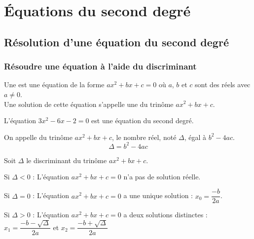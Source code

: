 \chapter[Equ. 2nd degré]{Équations du second degré}
\thispagestyle{fancy}

\section{Résolution d'une équation du second degré}

\subsection{Résoudre une équation à l'aide du discriminant}

    \begin{definition}
        Une  est une équation de la forme $ax^2+bx+c=0$ où $a$, $b$ et $c$ sont des réels avec $a\neq 0$.\\
        Une solution de cette équation s'appelle une  du trinôme $ax^2+bx+c$.
    \end{definition}
    
    \begin{exemple}
        L'équation $3x^2-6x-2=0$ est une équation du second degré.
    \end{exemple}
    
        
    \begin{definition}
        On appelle  du trinôme $ax^2+bx+c$, le nombre réel, noté $\Delta$, égal à $b^2-4ac$.
        $$\Delta = b^2-4ac$$
    \end{definition}
        
    \begin{propriete}
        Soit $\Delta$ le discriminant du trinôme $ax^2+bx+c$.\\
        \begin{itemDef}
            \item Si $\Delta < 0$ : L'équation $ax^2+bx+c=0$ n'a pas de solution réelle.
            \item Si $\Delta = 0$ : L'équation $ax^2+bx+c=0$ a une unique solution : $x_0= \dfrac{-b}{2a}$.
            \item Si $\Delta > 0$ : L'équation $ax^2+bx+c=0$ a deux solutions distinctes :\\
            \hspace*{3cm} $x_1= \dfrac{-b-\sqrt{\Delta}}{2a}$ \hspace*{0.5cm} et \hspace*{0.5cm} $x_2= \dfrac{-b+\sqrt{\Delta}}{2a}$
        \end{itemDef}         
    \end{propriete}
        
